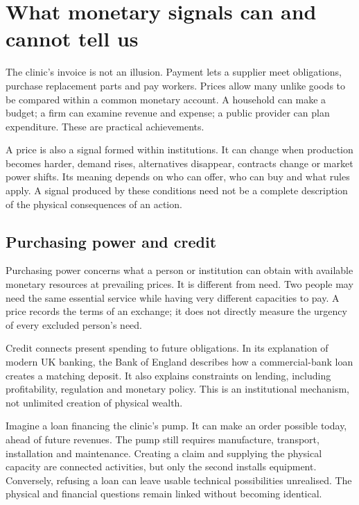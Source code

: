 \chapter{What monetary signals can and cannot tell us}\label{ch:money}

The clinic's invoice is not an illusion. Payment lets a supplier meet obligations, purchase replacement parts and pay workers. Prices allow many unlike goods to be compared within a common monetary account. A household can make a budget; a firm can examine revenue and expense; a public provider can plan expenditure. These are practical achievements.

A price is also a signal formed within institutions. It can change when production becomes harder, demand rises, alternatives disappear, contracts change or market power shifts. Its meaning depends on who can offer, who can buy and what rules apply. A signal produced by these conditions need not be a complete description of the physical consequences of an action.

\section{Purchasing power and credit}
Purchasing power concerns what a person or institution can obtain with available monetary resources at prevailing prices. It is different from need. Two people may need the same essential service while having very different capacities to pay. A price records the terms of an exchange; it does not directly measure the urgency of every excluded person's need.

Credit connects present spending to future obligations. In its explanation of modern UK banking, the Bank of England describes how a commercial-bank loan creates a matching deposit. It also explains constraints on lending, including profitability, regulation and monetary policy. This is an institutional mechanism, not unlimited creation of physical wealth.\cite{boe}

Imagine a loan financing the clinic's pump. It can make an order possible today, ahead of future revenues. The pump still requires manufacture, transport, installation and maintenance. Creating a claim and supplying the physical capacity are connected activities, but only the second installs equipment. Conversely, refusing a loan can leave usable technical possibilities unrealised. The physical and financial questions remain linked without becoming identical.

